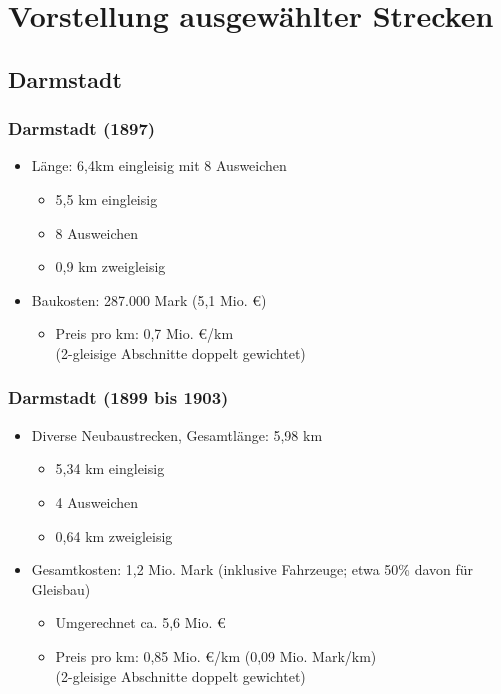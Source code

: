 \documentclass[xcolor=dvipsnames]{beamer}
\begin{document}
\section{Vorstellung ausgewählter Strecken}

\subsection{Darmstadt}
\begin{frame}
  \frametitle{Darmstadt (1897)}

  \begin{itemize}
  \item Länge: 6,4km eingleisig mit 8 Ausweichen
    \begin{itemize}
    \item 5,5 km eingleisig
    \item 8 Ausweichen
    \item 0,9 km zweigleisig
    \end{itemize}
  \item Baukosten: 287.000 Mark (5,1 Mio. €)
    \begin{itemize}
    \item Preis pro km: 0,7 Mio. €/km\\
      (2-gleisige Abschnitte doppelt gewichtet)
    \end{itemize}
  \end{itemize}
\end{frame}


\begin{frame}
  \frametitle{Darmstadt (1899 bis 1903)}

  \begin{itemize}
  \item Diverse Neubaustrecken, Gesamtlänge: 5,98 km
    \begin{itemize}
    \item 5,34 km eingleisig
    \item 4 Ausweichen
    \item 0,64 km zweigleisig
    \end{itemize}
  \item Gesamtkosten: 1,2 Mio. Mark (inklusive Fahrzeuge; etwa 50\%
    davon für Gleisbau)
    \begin{itemize}
    \item Umgerechnet ca. 5,6 Mio. €
    \item Preis pro km: 0,85 Mio. €/km (0,09 Mio. Mark/km)\\
      (2-gleisige Abschnitte doppelt gewichtet)
    \end{itemize}
  \end{itemize}
\end{frame}
\end{document}
